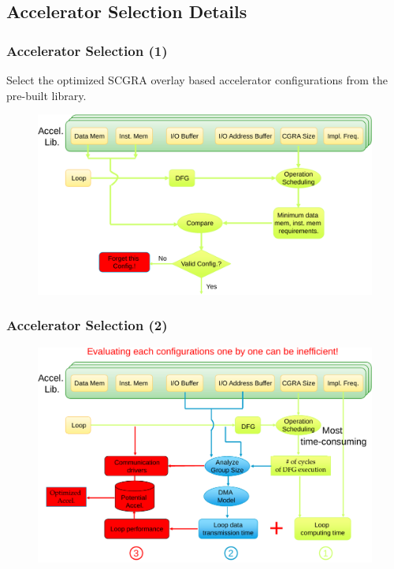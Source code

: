 \documentclass[accentcolor=tud1a,colorbacktitle,inverttitle,landscape,german,presentation,t]{tudbeamer}
\begin{document}
  \subsection{Accelerator Selection Details}
  \begin{frame}
\frametitle{Accelerator Selection (1)}
Select the optimized SCGRA overlay based accelerator configurations from the pre-built library.
  \begin{figure}
     \includegraphics[width=.95\linewidth]{accel-sel1}
  \end{figure}
\end{frame}

\begin{frame}
\frametitle{Accelerator Selection (2)}
  \begin{figure}
     \includegraphics[width=.95\linewidth]{accel-sel2}
  \end{figure}
\end{frame}
\end{document}
